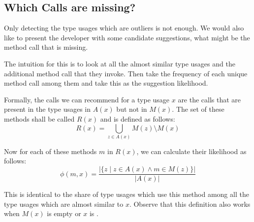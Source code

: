 \subsection{Which Calls are missing?}

Only detecting the type usages which are outliers is not enough.
We would also like to present the developer with some candidate suggestions, what might be the method call that is missing.

The intuition for this is to look at all the almost similar type usages and the additional method call that they invoke.
Then take the frequency of each unique method call among them and take this as the suggestion likelihood.

Formally, the calls we can recommend for a type usage $x$ are the calls that are present in the type usages in $A(x)$ but not in $M(x)$.
The set of these methods shall be called $R(x)$ and is defined as follows:
\begin{equation*}
    R(x) = \bigcup_{z \in A(x)} M(z) \setminus M(x)
\end{equation*}

Now for each of these methods $m$ in $R(x)$, we can calculate their likelihood as follows:
\begin{equation*}
    \phi(m, x) = \frac{|\{z \mid z \in A(x) \land m \in M(z)\}|}{|A(x)|}
\end{equation*}

This is identical to the share of type usages which use this method among all the type usages which are almost similar to $x$.
Observe that this definition also works when $M(x)$ is empty or $x$ is .

